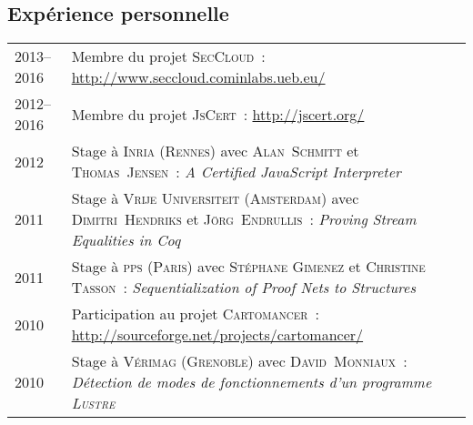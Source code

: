 \documentclass[12pt,a4paper]{article}
\makeatletter
\newcommand{\en}[1]{\foreignlanguage{english}{\textit{#1}}}
\newcommand{\en}[1]{\foreignlanguage{english}{\textit{#1}}}
\newenvironment{datecvsection}[1]%
               {\subsection*{#1}%
                 \noindent \begin{tabular}{@{}p{\annee}p{\texte}@{}}}
               {\end{tabular}}
\makeatother
\begin{document}
\begin{datecvsection}{Expérience personnelle}

	2013–2016 & Membre du projet \textsc{SecCloud}~:  \url{http://www.seccloud.cominlabs.ueb.eu/} \\

	2012–2016 & Membre du projet \textsc{JsCert}~:  \url{http://jscert.org/} \\

	2012 & Stage à \textsc{Inria} (\textsc{Rennes}) avec \textsc{Alan~Schmitt} et \textsc{Thomas~Jensen}~:
	\en{\textit{A Certified JavaScript Interpreter}} \\

	2011 & Stage à \textsc{Vrĳe Universiteit} (\textsc{Amsterdam}) avec \textsc{Dimitri~Hendriks} et \textsc{Jörg~Endrullis}~:
	\en{\textit{Proving Stream Equalities in Coq}} \\

	2011 & Stage à \textsc{pps} (\textsc{Paris}) avec \textsc{Stéphane Gimenez} et \textsc{Christine Tasson}~:
	\en{\textit{Sequentialization of Proof Nets to Structures}} \\

	2010 & Participation au projet \textsc{Cartomancer}~:  \url{http://sourceforge.net/projects/cartomancer/} \\

	2010 & Stage à \textsc{Vérimag} (\textsc{Grenoble}) avec \textsc{David~Monniaux}~:
	\textit{Détection de modes de fonctionnements d’un programme \textsc{Lustre}} \\

\end{datecvsection}
\end{document}
